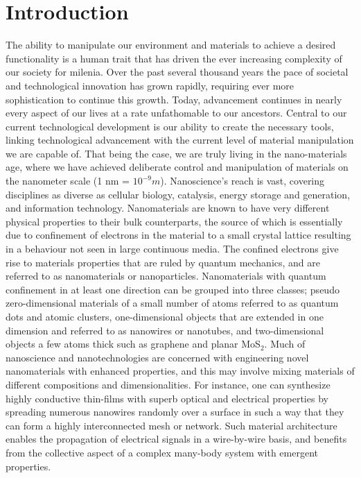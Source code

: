 \chapter{Introduction}
The ability to manipulate our environment and materials to achieve a desired functionality is a human trait that has driven the ever increasing complexity of our society for milenia. Over the past several thousand years the pace of societal and technological innovation has grown rapidly, requiring ever more sophistication to continue this growth. Today, advancement continues in nearly every aspect of our lives at a rate unfathomable to our ancestors. Central to our current technological development is our ability to create the necessary tools, linking technological advancement with the current level of material manipulation we are capable of. That being the case, we are truly living in the nano-materials age, where we have achieved deliberate control and manipulation of materials on the nanometer scale (1 nm = $10^{-9} m$). Nanoscience's reach is vast\cite{bhushan2017}, covering disciplines as diverse as cellular biology\cite{ferrari2005}, catalysis\cite{daniel2004}, energy storage and generation\cite{simon2010,law2005}, and information technology\cite{bez2003,rueckes2000,thompson2006}. Nanomaterials are known to have very different physical properties to their bulk counterparts, the source of which is essentially due to confinement of electrons in the material to a small crystal lattice resulting in a behaviour not seen in large continuous media\cite{datta2005}. The confined electrons give rise to materials properties that are ruled by quantum mechanics, and are referred to as nanomaterials or nanoparticles. Nanomaterials with quantum confinement in at least one direction can be grouped into three classes; pseudo zero-dimensional materials of a small number of atoms referred to as quantum dots and atomic clusters\cite{alivisatos1996,turner2008}, one-dimensional objects that are extended in one dimension and referred to as nanowires or nanotubes\cite{adelung1999,iijima1991}, and two-dimensional objects a few atoms thick such as graphene\cite{novoselov2004} and planar MoS$_2$\cite{mak2010,jadwiszczak2018}. Much of nanoscience and nanotechnologies are concerned with engineering novel nanomaterials with enhanced properties, and this may involve mixing materials of different compositions and dimensionalities. For instance, one can synthesize highly conductive thin-films with superb optical and electrical properties by spreading numerous nanowires randomly over a surface in such a way that they can form a highly interconnected mesh or network. Such material architecture enables the propagation of electrical signals in a wire-by-wire basis, and benefits from the collective aspect of a complex many-body system with emergent properties.

